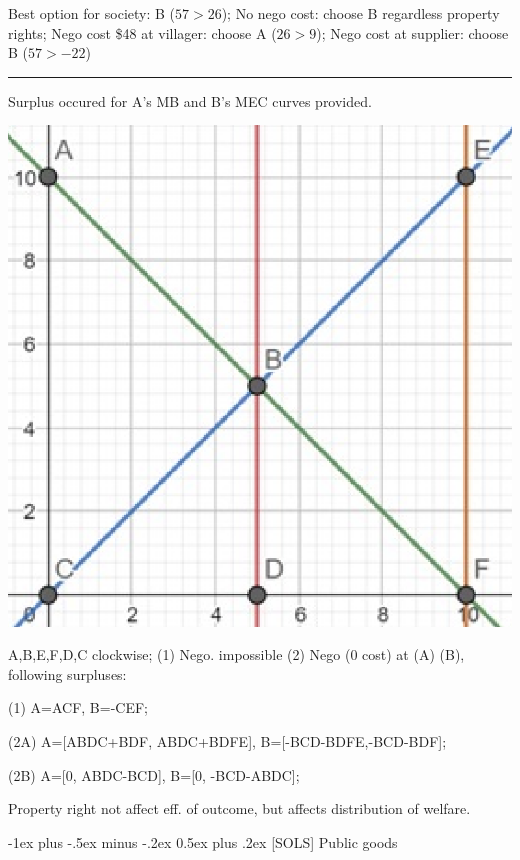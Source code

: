 \documentclass[a4paper]{article}
\makeatletter
\renewcommand{\section}{\@startsection{section}{1}{0mm}%
                                {-1ex plus -.5ex minus -.2ex}%
                                {0.5ex plus .2ex}%
                                {\normalfont\small\bfseries}}
\makeatother
\begin{document}
\begin{multicols*}{3}
    Best option for society: B ($57>26$); No nego cost: choose B regardless property rights; Nego cost \$48 at villager: choose A ($26>9$); Nego cost at supplier: choose B ($57>-22$)

    \rule{1\linewidth}{0.4pt}

    Surplus occured for A's MB and B's MEC curves provided.

    \begin{minipage}{0.3\linewidth}
        \includegraphics[width=\linewidth]{./exter.png}
    \end{minipage}
    \begin{minipage}{0.65\linewidth}
        A,B,E,F,D,C clockwise; (1) Nego. impossible (2) Nego (0 cost) at (A) (B), following surpluses:

        (1) A=ACF, B=-CEF;

        (2A) A=[ABDC+BDF, ABDC+BDFE], B=[-BCD-BDFE,-BCD-BDF];

        (2B) A=[0, ABDC-BCD], B=[0, -BCD-ABDC];

        Property right not affect eff. of outcome, but affects distribution of welfare.
    \end{minipage}

    \section{[SOLS] Public goods}


\end{multicols*}
\end{document}
